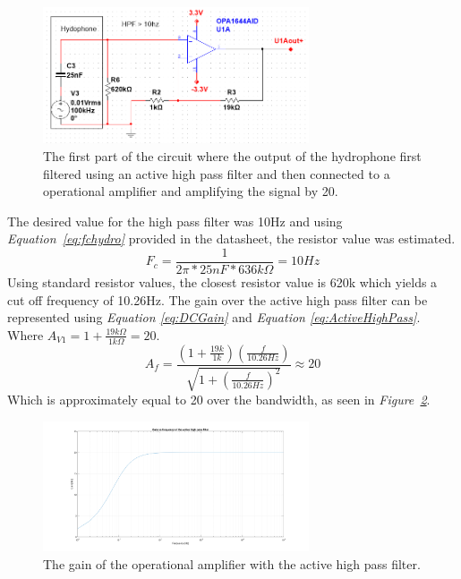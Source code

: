 \begin{figure}[h]
    \centering
    \includegraphics[width=0.70\textwidth]{graphics/OPamp1.png}
    \caption{The first part of the circuit where the output of the hydrophone first filtered using an active high pass filter and then connected to a operational amplifier and amplifying the signal by 20.}
    \label{fig:Opamp1}
\end{figure}


The desired value for the high pass filter was 10Hz and using \textit{Equation~\ref{eq:fchydro}} provided in the datasheet, the resistor value was estimated.   
$$F_c = \frac{1}{2\pi * 25nF * 636k\Omega} = 10Hz$$
Using standard resistor values, the closest resistor value is 620k which yields a cut off frequency of 10.26Hz.
The gain over the active high pass filter can be represented using \textit{Equation \ref{eq:DCGain}} and \textit{Equation \ref{eq:ActiveHighPass}}. 
Where $A_{V1} = 1 + \frac{19k\Omega}{1k\Omega} = 20$.
$$A_f = \frac{(1+\frac{19k}{1k})(\frac{f}{10.26Hz})}{\sqrt{1 + (\frac{f}{10.26Hz})^2}} \approx 20$$
Which is approximately equal to 20 over the bandwidth, as seen in \textit{Figure~\ref{fig:AVhighpass}}.

\begin{figure}[h]
    \centering
    \includegraphics[width=0.7\textwidth]{graphics/Av_Highpass.png}
    \caption{The gain of the operational amplifier with the active high pass filter.}
    \label{fig:AVhighpass}
\end{figure}

\vspace{4cm}

